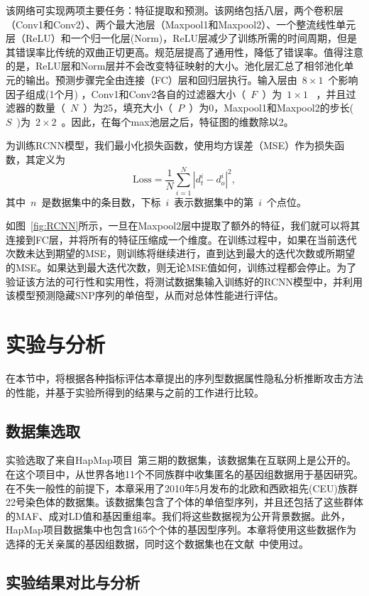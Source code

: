 该网络可实现两项主要任务：特征提取和预测。该网络包括八层，两个卷积层（Conv1和Conv2）、两个最大池层（Maxpool1和Maxpool2）、一个整流线性单元层（ReLU）和一个归一化层(Norm)，ReLU层减少了训练所需的时间周期，但是其错误率比传统的双曲正切更高。规范层提高了通用性，降低了错误率。值得注意的是，ReLU层和Norm层并不会改变特征映射的大小。池化层汇总了相邻池化单元的输出。预测步骤完全由连接（FC）层和回归层执行。输入层由~$8\times 1$~个影响因子组成(1个月) ，Conv1和Conv2各自的过滤器大小（~$F$~）为~$1\times 1$~ ，并且过滤器的数量（~$N$~）为25，填充大小（~$P$~）为0，Maxpool1和Maxpool2的步长(~$S$~)为~$2\times 2$~。因此，在每个max池层之后，特征图的维数除以2。


为训练RCNN模型，我们最小化损失函数，使用均方误差（MSE）作为损失函数，其定义为
\begin{equation}
\text{Loss}=\frac{1}{N}\sum_{i=1}^{N}|d_{t}^{i}-d_{o}^{i}|^{2},
\end{equation}
其中~$n$~是数据集中的条目数，下标~$i$~表示数据集中的第~$i$~个点位。


如图~\ref{fig:RCNN}所示，一旦在Maxpool2层中提取了额外的特征，我们就可以将其连接到FC层，并将所有的特征压缩成一个维度。在训练过程中，如果在当前迭代次数未达到期望的MSE，则训练将继续进行，直到达到最大的迭代次数或所期望的MSE。如果达到最大迭代次数，则无论MSE值如何，训练过程都会停止。为了验证该方法的可行性和实用性，将测试数据集输入训练好的RCNN模型中，并利用该模型预测隐藏SNP序列的单倍型，从而对总体性能进行评估。


\section{实验与分析}\label{sec:resul}
在本节中，将根据各种指标评估本章提出的序列型数据属性隐私分析推断攻击方法的性能，并基于实验所得到的结果与之前的工作进行比较。

\subsection{数据集选取}
实验选取了来自HapMap项目~\cite{thorisson2005international}第三期的数据集，该数据集在互联网上是公开的。在这个项目中，从世界各地11个不同族群中收集匿名的基因组数据用于基因研究。在不失一般性的前提下，本章采用了2010年5月发布的北欧和西欧祖先(CEU)族群22号染色体的数据集。该数据集包含了个体的单倍型序列，并且还包括了这些群体的MAF、成对LD值和基因重组率。我们将这些数据视为公开背景数据。此外，HapMap项目数据集中也包含165个个体的基因型序列。本章将使用这些数据作为选择的无关亲属的基因组数据，同时这个数据集也在文献~\cite{samani2015quantifying}中使用过。
\subsection{实验结果对比与分析}

